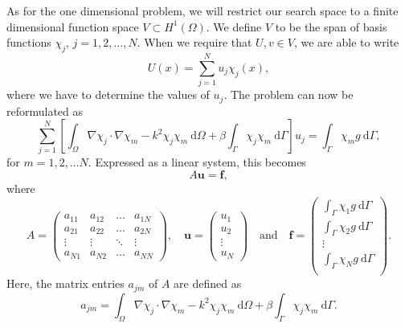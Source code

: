 \documentclass[a4paper]{article}
\newcommand{\dd}{\mathrm{d}}
\newcommand{\vct}{\mathbf}
\newcommand{\HO}{\ensuremath{H^1(\Omega)}}
\begin{document}
As for the one dimensional problem, we will restrict our search space
to a finite dimensional function space $V \subset \HO$. We define $V$
to be the span of basis functions $\chi_j$, $j = 1, 2, \ldots, N$.
When we require that $U, v \in V$, we are able to write
\begin{equation}
  U(x) = \sum^N_{j = 1} u_j \chi_j(x),
\end{equation}
where we have to determine the values of $u_j$. The problem can now be
reformulated as
\begin{equation}
  \sum^N_{j = 1} \left[
    \int_\Omega \nabla \chi_j \cdot \nabla \chi_m
    - k^2 \chi_j \chi_m \ \dd\Omega
    + \beta \int_\Gamma \chi_j \chi_m \ \dd\Gamma
  \right] u_j
  =
  \int_\Gamma \chi_m g \ \dd\Gamma,
\end{equation}
for $m = 1, 2, \ldots N$. Expressed as a linear system, this becomes
\begin{equation*}
  A \vct{u} = \vct{f},
\end{equation*}
where
\begin{equation*}
  A = \begin{pmatrix}
    a_{11} & a_{12} & \hdots  & a_{1N} \\
    a_{21} & a_{22} & \hdots  & a_{2N} \\
    \vdots & \vdots & \ddots  & \vdots \\
    a_{N1} & a_{N2} & \hdots  & a_{NN}
  \end{pmatrix},
\quad
\vct{u} = \begin{pmatrix}
    u_1 \\
    u_2 \\
    \vdots \\
    u_N
\end{pmatrix}
\quad \text{and} \quad
\vct{f} = \begin{pmatrix}
    \int_\Gamma \chi_1 g \ \dd\Gamma \\
    \int_\Gamma \chi_2 g \ \dd\Gamma \\
    \vdots \\
    \int_\Gamma \chi_N g \ \dd\Gamma \\
\end{pmatrix}.
\end{equation*}
Here, the matrix entries $a_{jm}$ of $A$ are defined as
\begin{equation*}
  a_{jm}
  = \int_\Omega \nabla \chi_j \cdot \nabla \chi_m
    - k^2 \chi_j \chi_m \ \dd\Omega
    + \beta \int_\Gamma \chi_j \chi_m \ \dd\Gamma.
\end{equation*}
\end{document}

